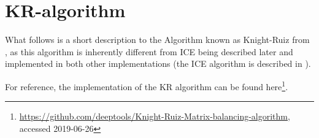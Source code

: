 \section{KR-algorithm}\label{sec:KR}


What follows is a short description to the Algorithm known as Knight-Ruiz from
\cite{knight2013fast}, as this algorithm is inherently different from ICE being
described later and implemented in both other implementations
(the ICE algorithm is described in ).






For reference, the implementation of the KR algorithm can be found here\footnote{\url{https://github.com/deeptools/Knight-Ruiz-Matrix-balancing-algorithm}, accessed 2019-06-26}.










